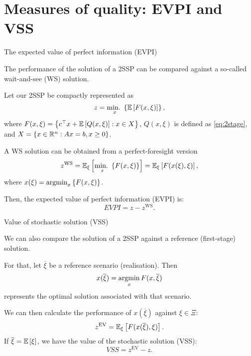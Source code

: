 \section{Measures of quality: EVPI and VSS}


\begin{frame}{The expected value of perfect information (EVPI)}

	The performance of the solution of a 2SSP can be compared against a so-called \alert{wait-and-see} (WS) solution.
	
	Let our 2SSP be compactly represented as
	\begin{equation*}
		z = \mathop{\text{min.} \ }_x \left\{ \mathbb{E}\left[ F(x,\xi) \right] \right \}, 	
	\end{equation*}
	where $F(x,\xi) = \left\{ c^\top x + \mathbb{E}\left[ Q(x,\xi) \right] : x \in X \right \}$, $Q(x,\xi)$ is defined as \eqref{eq:2stage}, and $X=\left\{ x \in \mathbb R^n : Ax = b, x \ge 0 \right \}$.
	
	\pause
	A WS solution can be obtained from a \alert{perfect-foresight} version
	\begin{equation*}
		z^{\text{WS}} = \mathbb{E}_\xi\left[ \mathop{\text{min.} \ }_x \left\{ F(x,\xi) \right \} \right] = \mathbb{E}_\xi\left[ F(x(\xi), \xi) \right],
	\end{equation*}
	where $x(\xi) = \mathop{\rm argmin}_x \left\{ F(x,\xi) \right \}$.
	
	\pause
	Then, the expected value of perfect information (EVPI) is: 
	$$
		EVPI = z - z^{\text{WS}}.
	$$
\end{frame}


\begin{frame}{Value of stochastic solution (VSS)}

	We can also compare the solution of a 2SSP against a \alert{reference (first-stage) solution}. 
	
	For that, let $\overline{\xi}$ be a reference scenario (realisation). Then
	$$
		x(\overline{\xi}) = \mathop{\rm argmin}_x F(x, \overline{\xi}) 
	$$
	represents the optimal solution associated with that scenario.
	
	\pause
	
	We can then calculate the performance of $x(\overline{\xi})$ against $\xi \in \Xi$:		 
	$$
		z^{\text{EV}} = \mathbb{E}_\xi\left[ F(x(\overline{\xi}), \xi) \right].
	$$
	If $\overline{\xi} = \mathbb{E}\left[ \xi \right]$, we have the \alert{value of the stochastic solution (VSS)}:
	$$
		VSS = z^{\text{EV}} - z.
	$$
	
\end{frame}

